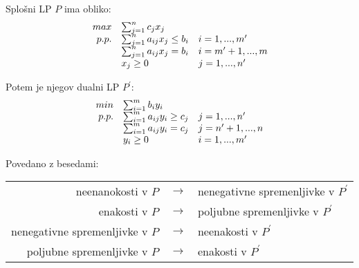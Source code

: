 \documentclass[11pt, a4paper]{article}
\begin{document}
    \begin{theorem}
        Splošni LP \(P\) ima obliko:
        \[
            \begin{array}{r l l}
                max & \sum_{j=1}^{n} c_j x_j \\ 
                p.p. & \sum_{j=1}^{n} a_{ij} x_j \le b_i & i=1,...,m^\prime \\
                & \sum_{j=1}^{n} a_{ij} x_j = b_i & i=m^\prime + 1,...,m \\
                & x_j \ge 0 & j=1,...,n^\prime
            \end{array}
        \]
        

        Potem je njegov dualni LP \(P^\prime\):
        \[
            \begin{array}{r l l}
                min & \sum_{i=1}^{m} b_i y_i \\ 
                p.p. & \sum_{i=1}^{m} a_{ij} y_i \ge c_j & j=1,...,n^\prime \\
                & \sum_{i=1}^{m} a_{ij} y_i =  c_j & j=n^\prime + 1,...,n \\
                & y_i \ge 0 &  i=1,...,m^\prime
            \end{array}
        \]

        Povedano z besedami:
        \begin{center}
            \begin{tabular}{r c l}
                neenanokosti v \(P\) & \(\longrightarrow\) & nenegativne spremenljivke v \(P^\prime\) \\
                enakosti v \(P\) & \(\longrightarrow\) & poljubne spremenljivke v \(P^\prime\) \\
                nenegativne spremenljivke v \(P\) & \(\longrightarrow\) & neenakosti v \(P^\prime\) \\
                poljubne spremenljivke v \(P\) & \(\longrightarrow\) & enakosti v \(P^\prime\) \\
            \end{tabular}
        \end{center}
        
            
    \end{theorem}
\end{document}
